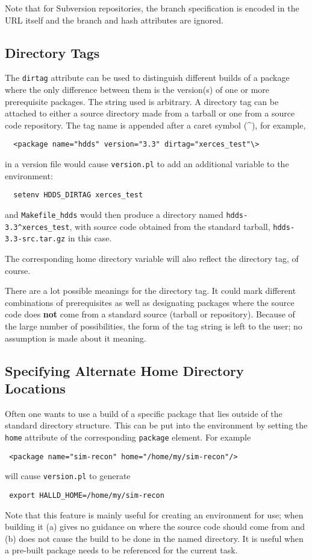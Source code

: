 \documentclass[12pt]{article}
\begin{document}
Note that for Subversion repositories, the branch specification is
encoded in the URL itself and the branch and hash attributes are ignored.

\subsection{Directory Tags}\label{section:directory-tags}

The {\tt dirtag} attribute can be used to distinguish different builds
of a package where the only difference between them is the version(s)
of one or more prerequisite packages. The string used is arbitrary. A
directory tag can be attached to either a source directory made from a
tarball or one from a source code repository. The tag name is appended
after a caret symbol (\^{}), for example,
\begin{verbatim}
  <package name="hdds" version="3.3" dirtag="xerces_test"\>
\end{verbatim}
in a version file would cause {\tt version.pl} to add an additional
variable to the environment:
\begin{verbatim}
  setenv HDDS_DIRTAG xerces_test
\end{verbatim}
and {\tt Makefile\_hdds} would then produce a directory named
{\tt hdds-3.3\^{}xerces\_test}, with source code obtained from the standard
tarball, {\tt hdds-3.3-src.tar.gz} in this case.

The corresponding home directory variable will also reflect the
directory tag, of course.

There are a lot possible meanings for the directory tag. It could mark
different combinations of prerequisites as well as designating
packages where the source code does {\bf not} come from a standard
source (tarball or repository). Because of the large number of
possibilities, the form of the tag string is left to the user; no
assumption is made about it meaning.

\subsection{Specifying Alternate Home Directory Locations}

Often one wants to use a build of a specific package that lies outside
of the standard directory structure. This can be put into the
environment by setting the {\tt home} attribute of the corresponding
{\tt package} element. For example
\begin{center} \tt
<package name="sim-recon" home="/home/my/sim-recon"/>
\end{center}
will cause {\tt version.pl} to generate
\begin{center} \tt
export HALLD\_HOME=/home/my/sim-recon
\end{center}
Note that this feature is mainly useful for creating an environment
for use; when building it (a) gives no guidance on where the source
code should come from and (b) does not cause the build to be done in
the named directory. It is useful when a pre-built package needs to be
referenced for the current task.
\end{document}
